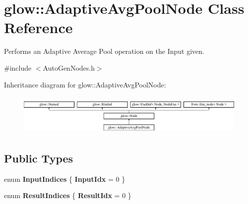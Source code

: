 \hypertarget{classglow_1_1_adaptive_avg_pool_node}{}\section{glow\+:\+:Adaptive\+Avg\+Pool\+Node Class Reference}
\label{classglow_1_1_adaptive_avg_pool_node}


Performs an Adaptive Average Pool operation on the Input given.  




{\ttfamily \#include $<$Auto\+Gen\+Nodes.\+h$>$}

Inheritance diagram for glow\+:\+:Adaptive\+Avg\+Pool\+Node\+:\begin{figure}[H]
\begin{center}
\leavevmode
\includegraphics[height=2.028986cm]{classglow_1_1_adaptive_avg_pool_node}
\end{center}
\end{figure}
\subsection*{Public Types}
\begin{DoxyCompactItemize}
\item 
\mbox{\label{classglow_1_1_adaptive_avg_pool_node_ae99898a399ed2026ffefeacd9d05e26b}} 
enum {\bfseries Input\+Indices} \{ {\bfseries Input\+Idx} = 0
 \}
\item 
\mbox{\label{classglow_1_1_adaptive_avg_pool_node_a7d78a352b93be6afc6546f7e82fd34bf}} 
enum {\bfseries Result\+Indices} \{ {\bfseries Result\+Idx} = 0
 \}
\end{DoxyCompactItemize}
